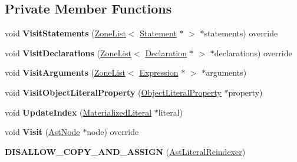 \subsection*{Private Member Functions}
\begin{DoxyCompactItemize}
\item 
void {\bfseries Visit\+Statements} (\hyperlink{classv8_1_1internal_1_1_zone_list}{Zone\+List}$<$ \hyperlink{classv8_1_1internal_1_1_statement}{Statement} $\ast$ $>$ $\ast$statements) override\hypertarget{classv8_1_1internal_1_1_ast_literal_reindexer_aa7981806dc8fc27d659089aa70d7368f}{}\label{classv8_1_1internal_1_1_ast_literal_reindexer_aa7981806dc8fc27d659089aa70d7368f}

\item 
void {\bfseries Visit\+Declarations} (\hyperlink{classv8_1_1internal_1_1_zone_list}{Zone\+List}$<$ \hyperlink{classv8_1_1internal_1_1_declaration}{Declaration} $\ast$ $>$ $\ast$declarations) override\hypertarget{classv8_1_1internal_1_1_ast_literal_reindexer_ae706cc8d0ca9b9acb09d61be196d4c45}{}\label{classv8_1_1internal_1_1_ast_literal_reindexer_ae706cc8d0ca9b9acb09d61be196d4c45}

\item 
void {\bfseries Visit\+Arguments} (\hyperlink{classv8_1_1internal_1_1_zone_list}{Zone\+List}$<$ \hyperlink{classv8_1_1internal_1_1_expression}{Expression} $\ast$ $>$ $\ast$arguments)\hypertarget{classv8_1_1internal_1_1_ast_literal_reindexer_a12440badd1d7742781f6a2b4e5b8df62}{}\label{classv8_1_1internal_1_1_ast_literal_reindexer_a12440badd1d7742781f6a2b4e5b8df62}

\item 
void {\bfseries Visit\+Object\+Literal\+Property} (\hyperlink{classv8_1_1internal_1_1_object_literal_property}{Object\+Literal\+Property} $\ast$property)\hypertarget{classv8_1_1internal_1_1_ast_literal_reindexer_ac9e7010414105ea0dc0ab833fe7208e0}{}\label{classv8_1_1internal_1_1_ast_literal_reindexer_ac9e7010414105ea0dc0ab833fe7208e0}

\item 
void {\bfseries Update\+Index} (\hyperlink{classv8_1_1internal_1_1_materialized_literal}{Materialized\+Literal} $\ast$literal)\hypertarget{classv8_1_1internal_1_1_ast_literal_reindexer_a11b7f1ec6570c0aedb2b3566ab9c112d}{}\label{classv8_1_1internal_1_1_ast_literal_reindexer_a11b7f1ec6570c0aedb2b3566ab9c112d}

\item 
void {\bfseries Visit} (\hyperlink{classv8_1_1internal_1_1_ast_node}{Ast\+Node} $\ast$node) override\hypertarget{classv8_1_1internal_1_1_ast_literal_reindexer_a4969266eff6c059be068e2ef2249b7af}{}\label{classv8_1_1internal_1_1_ast_literal_reindexer_a4969266eff6c059be068e2ef2249b7af}

\item 
{\bfseries D\+I\+S\+A\+L\+L\+O\+W\+\_\+\+C\+O\+P\+Y\+\_\+\+A\+N\+D\+\_\+\+A\+S\+S\+I\+GN} (\hyperlink{classv8_1_1internal_1_1_ast_literal_reindexer}{Ast\+Literal\+Reindexer})\hypertarget{classv8_1_1internal_1_1_ast_literal_reindexer_add343edbddf6df39a446c63745e5bd0c}{}\label{classv8_1_1internal_1_1_ast_literal_reindexer_add343edbddf6df39a446c63745e5bd0c}

\end{DoxyCompactItemize}
